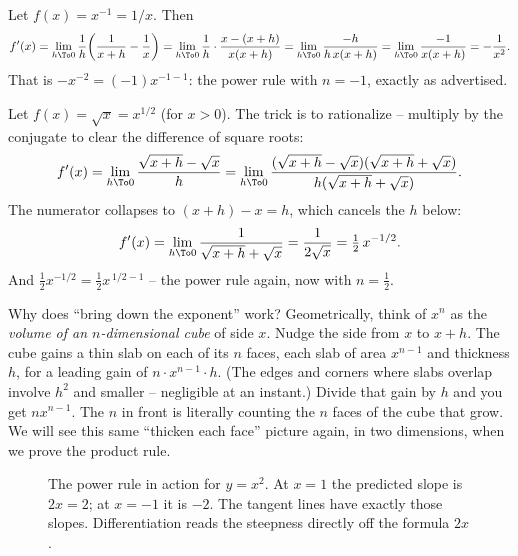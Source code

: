 \begin{example}\label{ch11:ex-reciprocal}
Let $f(x)=x^{-1}=1/x$. Then
\[
  f'(x)=\lim_{h\To 0}\frac{1}{h}\!\left(\frac{1}{x+h}-\frac{1}{x}\right)
       =\lim_{h\To 0}\frac{1}{h}\cdot\frac{x-(x+h)}{x(x+h)}
       =\lim_{h\To 0}\frac{-h}{h\,x(x+h)}
       =\lim_{h\To 0}\frac{-1}{x(x+h)}
       = -\frac{1}{x^2}.
\]
That is $-x^{-2} = (-1)x^{-1-1}$: the power rule with $n=-1$, exactly as advertised.
\end{example}

\begin{example}\label{ch11:ex-sqrt}
Let $f(x)=\sqrt{x}=x^{1/2}$ (for $x>0$). The trick is to rationalize -- multiply by the
conjugate to clear the difference of square roots:
\[
  f'(x)=\lim_{h\To 0}\frac{\sqrt{x+h}-\sqrt{x}}{h}
       =\lim_{h\To 0}\frac{(\sqrt{x+h}-\sqrt{x})(\sqrt{x+h}+\sqrt{x})}{h(\sqrt{x+h}+\sqrt{x})}.
\]
The numerator collapses to $(x+h)-x = h$, which cancels the $h$ below:
\[
  f'(x)=\lim_{h\To 0}\frac{1}{\sqrt{x+h}+\sqrt{x}}
       = \frac{1}{2\sqrt{x}}
       = \tfrac12\,x^{-1/2}.
\]
And $\tfrac12 x^{-1/2} = \tfrac12 x^{\,1/2 - 1}$ -- the power rule again, now with
$n=\tfrac12$.
\end{example}

\begin{whybox}
Why does ``bring down the exponent'' work? Geometrically, think of $x^n$ as the
\emph{volume of an $n$-dimensional cube} of side $x$. Nudge the side from $x$ to $x+h$.
The cube gains a thin slab on each of its $n$ faces, each slab of area $x^{n-1}$ and
thickness $h$, for a leading gain of $n\cdot x^{n-1}\cdot h$. (The edges and corners where
slabs overlap involve $h^2$ and smaller -- negligible at an instant.) Divide that gain by
$h$ and you get $n x^{n-1}$. The $n$ in front is literally counting the $n$ faces of the
cube that grow. We will see this same ``thicken each face'' picture again, in two
dimensions, when we prove the product rule.
\end{whybox}

\begin{figure}[H]
\centering
{}
\caption{The power rule in action for $y=x^2$. At $x=1$ the predicted slope is $2x=2$;
at $x=-1$ it is $-2$. The tangent lines have exactly those slopes. Differentiation reads
the steepness directly off the formula $2x$.}
\label{ch11:fig-power}
\end{figure}

